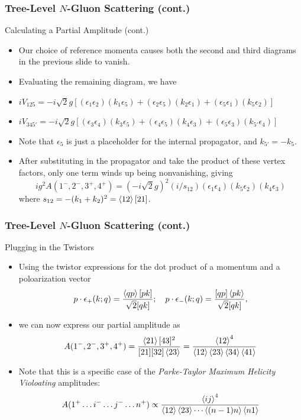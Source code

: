 \documentclass{beamer}
\begin{document}
\begin{frame}
    \frametitle{Tree-Level $N$-Gluon Scattering (cont.)}
    \alert{Calculating a Partial Amplitude (cont.)}
    \begin{itemize}
        \item[\textbullet]<2-> Our choice of reference momenta causes both the second and third diagrams in the previous slide to vanish.
        \item[\textbullet]<3-> Evaluating the remaining diagram, we have
        \item<4-> $ iV_{125} = -i\sqrt{2}g\left[(\epsilon_1\epsilon_2)(k_1\epsilon_5) + (\epsilon_2\epsilon_5)(k_2\epsilon_1) + (\epsilon_5\epsilon_1)(k_5\epsilon_2)\right] $
        \item<5-> $ iV_{345'} = -i\sqrt{2}g\left[(\epsilon_3\epsilon_4)(k_3\epsilon_5) + (\epsilon_4\epsilon_5)(k_4\epsilon_3) + (\epsilon_5\epsilon_3)(k_{5'}\epsilon_4)\right] $
        \item[\textbullet]<6-> Note that $\epsilon_5$ is just a placeholder for the internal propagator, and $k_{5'} = -k_5$.
        \item[\textbullet]<7-> After substituting in the propagator and take the product of these vertex factors, only one term winds up being nonvanishing, giving \[ ig^2A(1^-,2^-,3^+,4^+) = (-i\sqrt{2}g)^2(i/s_{12})(\epsilon_1\epsilon_4)(k_5\epsilon_2)(k_4\epsilon_3) \] where $s_{12} = -(k_1 + k_2)^2 = \ev{12}[21]$.
    \end{itemize}
\end{frame}

\begin{frame}
    \frametitle{Tree-Level $N$-Gluon Scattering (cont.)}
    \alert{Plugging in the Twistors}
    \begin{itemize}
        \item[\textbullet]<2-> Using the twistor expressions for the dot product of a momentum and a poloarization vector \[ p\cdot\epsilon_+(k;q) = \frac{\ev{qp}[pk]}{\sqrt{2}[qk]}; \quad p\cdot\epsilon_-(k;q) = \frac{[qp]\ev{pk}}{\sqrt{2}[qk]}, \]
        \item[\textbullet]<3-> we can now express our partial amplitude as \[ A(1^-, 2^-, 3^+, 4^+) = \frac{\ev{21}[43]^2}{[21][32]\ev{23}} = \frac{\ev{12}^4}{\ev{12}\ev{23}\ev{34}\ev{41}} \]
        \item[\textbullet]<4-> Note that this is a specific case of the \textit{Parke-Taylor Maximum Helicity Violoating} amplitudes: \[ A(1^+\ldots i^-\ldots j^-\ldots n^+) \propto \frac{\ev{ij}^4}{\ev{12}\ev{23}\cdots\ev{(n-1)n}\ev{n1}} \]
        \end{itemize}
\end{frame}
\end{document}
